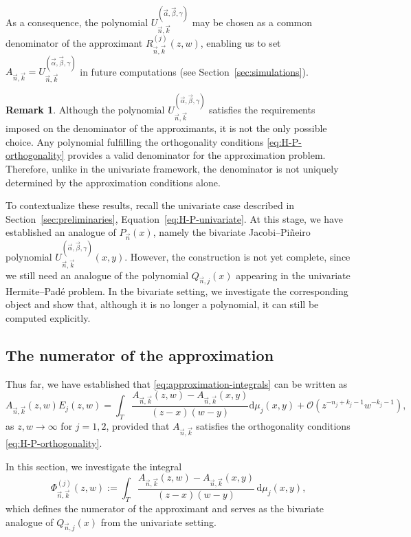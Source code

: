 \documentclass[11pt,reqno]{amsart}
\theoremstyle{definition}
\newtheorem{remark}[theorem]{Remark}
\begin{document}
As a consequence, the polynomial $U_{\vec n,\vec k}^{(\vec \alpha,\vec \beta,\gamma)}$ may be chosen as a common denominator of the approximant $R_{\vec n,\vec k}^{(j)}(z,w)$, enabling us to set $A_{\vec n,\vec k}=U_{\vec n,\vec k}^{(\vec \alpha,\vec \beta,\gamma)}$ in future computations (see Section~\ref{sec:simulations}).

\begin{remark}
    Although the polynomial $U_{\vec n,\vec k}^{(\vec \alpha,\vec \beta,\gamma)}$ satisfies the requirements imposed on the denominator of the approximants, it is not the only possible choice. Any polynomial fulfilling the orthogonality conditions \eqref{eq:H-P-orthogonality} provides a valid denominator for the approximation problem. Therefore, unlike in the univariate framework, the denominator is not uniquely determined by the approximation conditions alone.
\end{remark}

To contextualize these results, recall the univariate case described in Section~\ref{sec:preliminaries}, Equation~\eqref{eq:H-P-univariate}. At this stage, we have established an analogue of $P_{\vec n}(x)$, namely the bivariate Jacobi--Pi\~neiro polynomial $U_{\vec n,\vec k}^{(\vec \alpha,\vec \beta,\gamma)}(x,y)$. However, the construction is not yet complete, since we still need an analogue of the polynomial $Q_{\vec n,j}(x)$ appearing in the univariate Hermite--Padé problem. In the bivariate setting, we investigate the corresponding object and show that, although it is no longer a polynomial, it can still be computed explicitly.

\subsection{The numerator of the approximation}
Thus far, we have established that \eqref{eq:approximation-integrals} can be written as
\begin{equation}
    A_{\vec n,\vec k}(z,w)E_j(z,w) = \int_{T} \frac{A_{\vec n,\vec k}(z,w)-A_{\vec n,\vec k}(x,y) }{(z-x)(w-y)} \mathrm{d} \mu_j (x,y) + \mathcal{O}(z^{-n_j+k_j-1} w^{-k_j-1}),
\end{equation}
as $z,w\longrightarrow\infty$ for $j=1,2$, provided that $A_{\vec n,\vec k}$ satisfies the orthogonality conditions \eqref{eq:H-P-orthogonality}.

In this section, we investigate the integral
\begin{equation}
    \label{eq:integral-numerator}
    \Phi_{\vec n,\vec k}^{(j)}(z,w):=\int_{T} \frac{A_{\vec n,\vec k}(z,w)-A_{\vec n,\vec k}(x,y) }{(z-x)(w-y)} \, \mathrm{d} \mu_j (x,y),
\end{equation}
which defines the numerator of the approximant and serves as the bivariate analogue of $Q_{\vec n,j}(x)$ from the univariate setting. 
\end{document}
